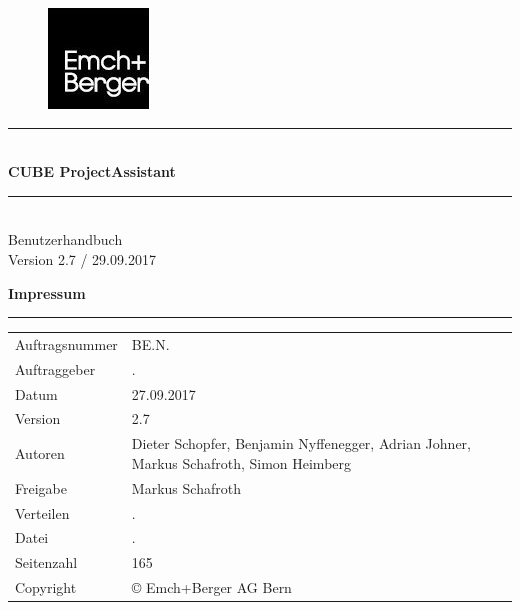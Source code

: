 \documentclass[12pt]{article} %
\newcommand{\HRule}{\rule{\linewidth}{0.5mm}} %
\begin{document}

\begin{titlepage}


\begin{figure}[t] %
\flushright  %
\includegraphics[width=0.2\linewidth]{0_EmBeLogo}
\end{figure}

\vspace*{6cm}

\center %

\HRule \\[0.4cm]
{ \huge \bfseries CUBE ProjectAssistant}\\[0.4cm] %
\HRule \\[1.5cm]

\textsf{\Large Benutzerhandbuch}\\[0.5cm] %
\textsf{\large Version 2.7 / 29.09.2017}\\[0.5cm] %


\pagebreak
\vspace*{15cm}

\flushleft\textbf{ Impressum}
\rule{\textwidth}{1pt}

\begin{tabular}{lp{12cm}}
Auftragsnummer & BE.N.\\
Auftraggeber & .\\
Datum & 27.09.2017\\
Version & 2.7\\
Autoren & Dieter Schopfer, Benjamin Nyffenegger, Adrian Johner, Markus Schafroth, Simon Heimberg\\
Freigabe & Markus Schafroth\\
Verteilen & .\\
Datei & .\\
Seitenzahl & 165\\
Copyright & \copyright{ Emch+Berger AG Bern}\\
\end{tabular}


\end{titlepage}
\end{document}
